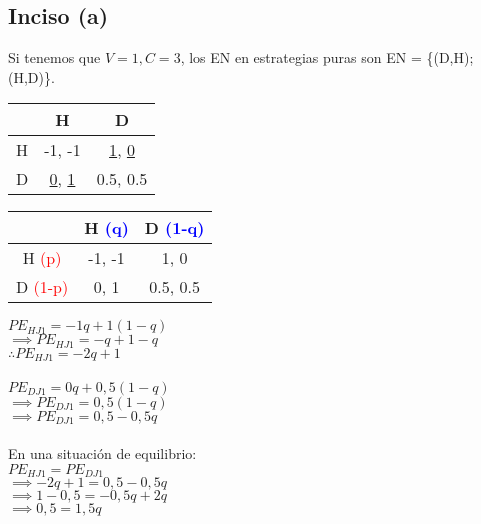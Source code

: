 \documentclass{article}
\newcommand{\ulcolor}[2][Red]{\setulcolor{#1}\ul{#2}}
\begin{document}
        \subsection*{Inciso (a)}
            Si tenemos que $V = 1, C = 3$, los EN en estrategias puras son EN = \{(D,H); (H,D)\}.
            \begin{table}[H]
                \begin{tabular}{|c|c|c|}
                    \hline
                        & H & D \\ \hline
                    H   & -1, -1 & \ulcolor[red]{1}, \ulcolor[blue]{0} \\ 
                    D   & \ulcolor[red]{0}, \ulcolor[blue]{1} & 0.5, 0.5 \\ \hline
                \end{tabular}
            \end{table}
            \begin{table}[H]
                \begin{tabular}{|c|c|c|}
                    \hline
                        & H \textcolor{blue}{(q)} & D \textcolor{blue}{(1-q)} \\ \hline
                    H \textcolor{red}{(p)} & -1, -1 & 1, 0 \\ 
                    D \textcolor{red}{(1-p)} & 0, 1 & 0.5, 0.5 \\ \hline
                \end{tabular}
            \end{table}
            \(PE_{HJ1} = -1q + 1(1-q)\) \\
            \(\implies PE_{HJ1} = -q + 1 - q\) \\
            \(\therefore PE_{HJ1} = -2q + 1\) \\
            \\
            \(PE_{DJ1} = 0q + 0,5(1-q)\) \\
            \(\implies PE_{DJ1} = 0,5(1-q)\) \\
            \(\implies PE_{DJ1} = 0,5-0,5q\) \\
            \\
            En una situación de equilibrio: \\
            \(PE_{HJ1} = PE_{DJ1}\) \\
            \(\implies -2q + 1 = 0,5-0,5q\) \\
            \(\implies 1-0,5 = -0,5q+2q\) \\
            \(\implies 0,5 = 1,5q\) \\
\end{document}
